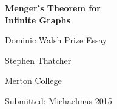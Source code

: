 \thispagestyle{empty}
\vfill
\begin{center}
{\Huge \bfseries
	Menger's Theorem for \\[1ex] Infinite Graphs
} \par
      
\large 
\vspace*{30mm} 
\logo \par
\vspace*{30mm}
Dominic Walsh Prize Essay \par
\vspace*{1ex}
{Stephen Thatcher} \par
\vspace*{1ex}
{Merton College} \par
\vspace*{8ex}
Submitted: Michaelmas 2015
  \end{center}
\vfill